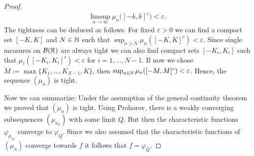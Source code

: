 \begin{proof}[Proof]
						\begin{align*}
							\limsup_{n\to\infty} \mu_n \big( [-k,k]^c \big)< \varepsilon.
						\end{align*}
						The tightness can be deduced as follows. For fixed $\varepsilon>0$ we can find a compact set $[-K,K]$ and $N\in\mathbb{N}$ such that $\sup_{n\geq N}\mu_n([-K,K]^c)<\varepsilon$. Since single measures on $\mathcal B(\mathbb{R})$ are always tight we can also find compact sets $[-K_i,K_i]$ such that $\mu_i([-K_i,K_i]^c)<\varepsilon$ for $i=1,...,N-1$. If now we chose $M:=\max\{K_1,...,K_{N-1}, K\}$, then $\sup_{n\in\mathbb{N}}\mu_n([-M,M]^c)<\varepsilon$. Hence, the sequence $(\mu_n)$ is tight.\smallskip


						Now we can summarize: Under the assumption of the general continuity theorem we proved that $(\mu_n)$ is tight. Using Prohorov, there is a weakly converging subsequences $(\mu_{n_k})$ with some limit $Q$. But then the characteristic functions $\varphi_{\mu_{n_k}}$ converge to $\varphi_Q$. Since we also assumed that the characteristic functions of $(\mu_n)$ converge towards $f$ it follows that $f=\varphi_Q$.
	\end{proof}
	

